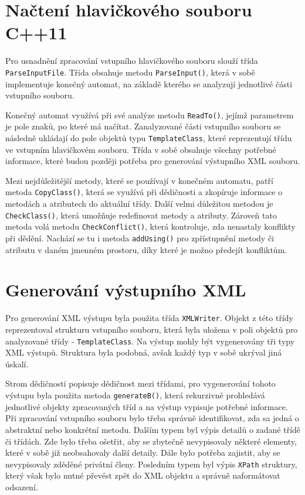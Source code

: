 \documentclass[10pt,a4paper,final]{article}
\begin{document}
  \section{Načtení hlavičkového souboru C++11} \label{nacitanie-suboru}
Pro usnadnění zpracování vstupního hlavičkového souboru slouží třída \texttt{ParseInputFile}. Třída obsahuje metodu \texttt{ParseInput()}, která v sobě implementuje konečný automat, na základě kterého se analyzují jednotlivé části vstupního souboru.

Konečný automat využívá při své analýze metodu \texttt{ReadTo()}, jejímž parametrem je pole znaků, po které má načítat. Zanalyzované části vstupního souboru se následně ukládají do pole objektů typu \texttt{TemplateClass}, které reprezentují třídu ve vstupním hlavičkovém souboru. Třída v sobě obsahuje všechny potřebné informace, které budou později potřeba pro generování výstupního XML souboru.

Mezi nejdůležitější metody, které se používají v konečném automatu, patří metoda \texttt{CopyClass()}, která se využívá při dědičnosti a zkopíruje informace o metodách a atributech do aktuální třídy. Další velmi důležitou metodou je \texttt{CheckClass()}, která umožňuje redefinovat metody a atributy. Zároveň tato metoda volá metodu \texttt{CheckConflict()}, která kontroluje, zda nenastaly konflikty při dědění.  Nachází se tu i metoda \texttt{addUsing()} pro zpřístupnění metody či atributu v daném jmenném prostoru, díky které je možno předejít konfliktům. 


  \section{Generování výstupního XML} \label{generovanie-xml}

Pro generování XML výstupu byla použita třída \texttt{XMLWriter}. Objekt z této třídy reprezentoval strukturu vstupního souboru, která byla uložena v poli objektů pro analyzované třídy - \texttt{TemplateClass}. Na výstup mohly být vygenerovány tři typy XML výstupů. Struktura byla podobná, avšak každý typ v sobě ukrýval jiná úskalí.

Strom dědičnosti popisuje dědičnost mezi třídami, pro vygenerování tohoto výstupu byla použita metoda \texttt{generateB()}, která rekurzivně prohledává jednotlivé objekty zpracovaných tříd a na výstup vypisuje potřebné informace. Při zpracování vstupního souboru bylo třeba správně identifikovat, zda sa jedná o abstraktní nebo konkrétní metodu. Dalším typem byl výpis detailů o zadané třídě či třídách. Zde bylo třeba ošetřit, aby se zbytečně nevypisovaly některé elementy, které v sobě již neobsahovaly další detaily. Dále bylo potřeba zajistit, aby se nevypisovaly zděděné privátní členy. Posledním typem byl výpis \texttt{XPath} struktury, který však bylo nutné převést zpět do XML objektu a správně naformátovat odsazení.
\end{document}
